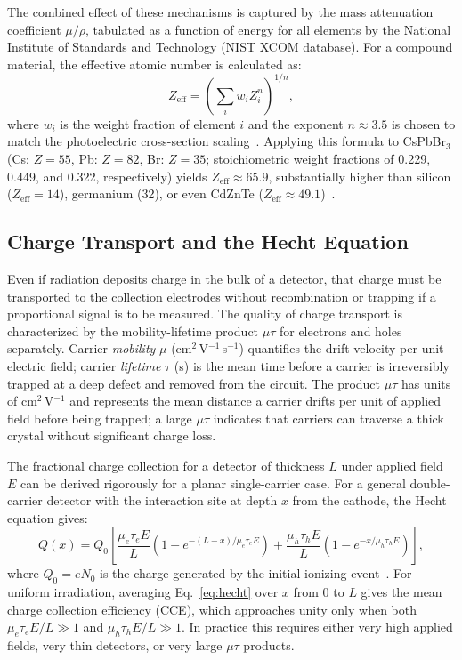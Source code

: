 The combined effect of these mechanisms is captured by the mass
attenuation coefficient $\mu/\rho$, tabulated as a function of energy
for all elements by the National Institute of Standards and Technology
(NIST XCOM database).  For a compound material, the effective atomic
number is calculated as:
\begin{equation}
  Z_{\mathrm{eff}} = \left(\sum_i w_i Z_i^n\right)^{1/n},
  \label{eq:Zeff}
\end{equation}
where $w_i$ is the weight fraction of element $i$ and the exponent
$n \approx 3.5$ is chosen to match the photoelectric cross-section
scaling~\cite{Murty1965}.  Applying this formula to CsPbBr$_3$
(Cs: $Z = 55$, Pb: $Z = 82$, Br: $Z = 35$; stoichiometric weight fractions
of 0.229, 0.449, and 0.322, respectively) yields $Z_{\mathrm{eff}} \approx 65.9$,
substantially higher than silicon ($Z_{\mathrm{eff}} = 14$), germanium (32),
or even CdZnTe ($Z_{\mathrm{eff}} \approx 49.1$)~\cite{Springer_CsPbBr3}.

\subsection{Charge Transport and the Hecht Equation}
\label{sec:hecht}

Even if radiation deposits charge in the bulk of a detector, that charge
must be transported to the collection electrodes without recombination
or trapping if a proportional signal is to be measured.  The quality of
charge transport is characterized by the mobility-lifetime product $\mu\tau$
for electrons and holes separately.  Carrier \emph{mobility} $\mu$
(cm$^2$\,V$^{-1}$\,s$^{-1}$) quantifies the drift velocity per unit
electric field; carrier \emph{lifetime} $\tau$ (s) is the mean time before
a carrier is irreversibly trapped at a deep defect and removed from the
circuit.  The product $\mu\tau$ has units of cm$^2$\,V$^{-1}$ and
represents the mean distance a carrier drifts per unit of applied field
before being trapped; a large $\mu\tau$ indicates that carriers can
traverse a thick crystal without significant charge loss.

The fractional charge collection for a detector of thickness $L$ under
applied field $E$ can be derived rigorously for a planar single-carrier
case.  For a general double-carrier detector with the interaction site
at depth $x$ from the cathode, the Hecht equation gives:
\begin{equation}
  Q(x) = Q_0 \left[
    \frac{\mu_e \tau_e E}{L}\left(1 - e^{-(L-x)/\mu_e\tau_e E}\right)
    +
    \frac{\mu_h \tau_h E}{L}\left(1 - e^{-x/\mu_h\tau_h E}\right)
  \right],
  \label{eq:hecht}
\end{equation}
where $Q_0 = eN_0$ is the charge generated by the initial ionizing
event~\cite{Hecht1932}.  For uniform irradiation, averaging
Eq.~\ref{eq:hecht} over $x$ from 0 to $L$ gives the mean charge
collection efficiency (CCE), which approaches unity only when both
$\mu_e\tau_e E/L \gg 1$ and $\mu_h\tau_h E/L \gg 1$.  In practice
this requires either very high applied fields, very thin detectors,
or very large $\mu\tau$ products.

